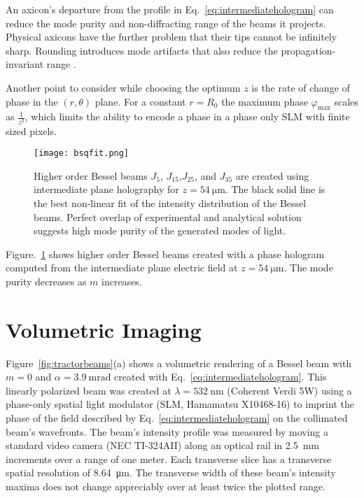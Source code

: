 An axicon's departure from the profile
in Eq.~\eqref{eq:intermediatehologram}
can reduce the mode purity and non-diffracting
range of the beams it projects.
Physical axicons have the further problem that
their tips cannot be infinitely sharp.
Rounding introduces mode artifacts that also reduce the 
propagation-invariant range \cite{brzobohaty08}.

Another point to consider while choosing the optimum $z$
is the rate of change of phase in the $(r,\theta)$ plane. For a 
constant $r=R_0$ the maximum phase 
$\varphi _{\mathrm{max}}$ scales as $\frac{1}{z^2}$, which
limits the ability to encode a phase in a phase only SLM 
with finite sized pixels.

\begin{figure}[t!]
  \centering
  \texttt{[image: bsqfit.png]}
  \caption{Higher order Bessel beams $J_{5}$,
 $ J_{15}$,$ J_{25}$, and $J_{35}$ are created using 
  intermediate plane holography for 
  $z=\SI{54 }{\um}$. The black solid line is 
  the best non-linear fit of the intensity distribution of
  the Bessel beams. Perfect overlap of experimental and 
  analytical solution suggests high mode purity of the
  generated modes of light.}
  \label{fig:bessel quality}
\end{figure}

Figure.~\ref{fig:bessel quality} shows higher order Bessel
beams created with a phase hologram computed from the 
intermediate plane electric field at $z=\SI{54}{\um}$.
The mode purity decreases as $m$ increases.


\section{Volumetric Imaging}

Figure~\ref{fig:tractorbeams}(a) shows a volumetric
rendering of a Bessel beam with $m = 0$ and
$\alpha = \SI{3.9}{\milli\radian}$ created with
Eq.~\eqref{eq:intermediatehologram}.
This linearly polarized beam was created at $\lambda = \SI{532}{\nm}$
(Coherent Verdi 5W)
using a phase-only spatial light modulator (SLM, Hamamatsu X10468-16)
to imprint the phase of the field described by
Eq.~\eqref{eq:intermediatehologram}
on the collimated beam's wavefronts.
The beam's intensity profile was measured by
moving a standard
video camera (NEC TI-324AII) along an optical rail in \SI{2.5}{\mm}
increments over a range of one meter.
Each transverse slice has a transverse spatial resolution of \SI{8.64}{\um}.
The transverse width of these beam's intensity maxima does not change
appreciably over at least twice the plotted range.

